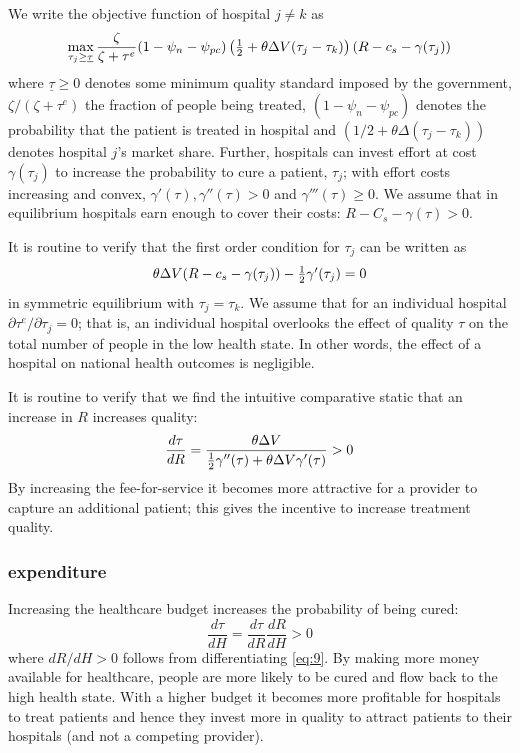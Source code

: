 \documentclass[a4paper,12pt]{article}
\begin{document}
We write the objective function of hospital \(j \neq k\) as
\begin{equation}
\label{eq:12}
\max_{\tau_j \geq \underline \tau} \frac{\zeta}{\zeta + \tau^e}(1-\psi_n-\psi_{pc})\left( \textstyle{1\over 2}  + \theta \Delta V (\tau_j - \tau_k) \right)(R-c_s - \gamma (\tau_j))
\end{equation}
where \(\underline \tau \geq 0\) denotes some minimum quality standard imposed by the government, \(\zeta/(\zeta+\tau^e)\) the fraction of people being treated, \((1-\psi_n - \psi_{pc})\) denotes the probability that the patient is treated in hospital and \((1/2 + \theta \Delta (\tau_j - \tau_k))\) denotes hospital \(j\)'s market share. Further, hospitals can invest effort at cost \(\gamma( \tau_j)\) to increase the probability to cure a patient, \(\tau_j\); with effort costs increasing and convex, \(\gamma'(\tau),\gamma''(\tau)>0\) and \(\gamma'''(\tau) \geq 0\). We assume that in equilibrium hospitals earn enough to cover their costs: \(R - C_s - \gamma(\tau) >0\).

It is routine to verify that the first order condition for \(\tau_j\) can be written as
\begin{equation}
\label{eq:13}
\theta \Delta V (R-c_s-\gamma(\tau_j))- \textstyle{1\over 2} \gamma'(\tau_{j})=0
\end{equation}
in symmetric equilibrium with \(\tau_j = \tau_k\). We assume that for an individual hospital \(\partial \tau^e/ \partial \tau_j =0\); that is, an individual hospital overlooks the effect of quality \(\tau\) on the total number of people in the low health state. In other words, the effect of a hospital on national health outcomes is negligible.

It is routine to verify that we find the intuitive comparative static that an increase in \(R\) increases quality:
\begin{equation}
\label{eq:20}
\frac{d\tau}{dR} = \frac{\theta \Delta V}{ \textstyle{1\over 2} \gamma''(\tau)+\theta \Delta V \gamma'(\tau) } > 0
\end{equation}
By increasing the fee-for-service  it becomes more attractive for a provider to capture an additional patient; this gives the incentive to increase treatment quality.


\subsubsection{expenditure}
\label{sec:orgc787a0e}

Increasing the healthcare budget increases the probability of being cured:
\begin{equation}
\label{eq:16}
\frac{d\tau}{dH} = \frac{d\tau}{dR} \frac{dR}{dH} > 0
\end{equation}
where \(dR/dH > 0\) follows from differentiating \eqref{eq:9}. By making more money available for healthcare, people are more likely to be cured and flow back to the high health state. With a higher budget it becomes more profitable for hospitals to treat patients and hence they invest more in quality to attract patients to their hospitals (and not a competing provider).
\end{document}
